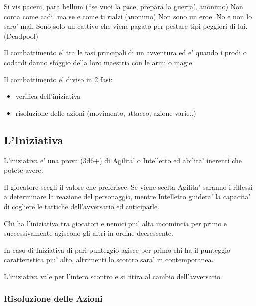 \documentclass[a4paper,11pt,twoside,openany]{dndbook}
\begin{document}
\label{combattimento}
\begin{quotebox}
Si vis pacem, para bellum (``se vuoi la pace, prepara la guerra', anonimo)\linebreak\linebreak
Non conta come cadi, ma se e come ti rialzi (anonimo)\linebreak\linebreak
Non sono un eroe. No e non lo saro' mai. Sono solo un cattivo che viene pagato per pestare tipi peggiori di lui. (Deadpool)
\end{quotebox}

Il combattimento e' tra le fasi principali di un avventura ed e' quando i prodi o codardi danno sfoggio della loro maestria con le armi o magie.

\bigskip

Il combattimento e' diviso in 2 fasi:
\begin{itemize}
\item verifica dell'iniziativa 
\item risoluzione delle azioni (movimento, attacco, azione varie..) 
\end{itemize}

\subsection{L'Iniziativa}

\label{liniziativa}

L'iniziativa e' una prova (3d6+) di Agilita' o Intelletto ed abilita' inerenti che potete avere.

Il giocatore scegli il valore che preferisce. Se viene scelta Agilita' saranno i riflessi a determinare la reazione del personaggio, mentre Intelletto guidera' la capacita' di cogliere le tattiche dell'avversario ed anticiparle.

Chi ha l'iniziativa tra giocatori e nemici piu' alta incomincia per primo e successivamente agiscono gli altri in ordine decrescente. 

In caso di Iniziativa di pari punteggio agisce per primo chi ha il punteggio caratteristica piu' alto, altrimenti lo scontro sara' in contemporanea.

L'iniziativa vale per l'intero scontro e si ritira al cambio dell'avversario.

\subsubsection{Risoluzione delle Azioni}
\end{document}
